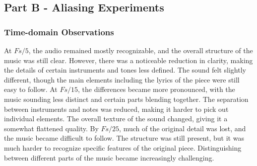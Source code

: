 \documentclass[12pt]{article}
\newcommand{\code}[1]{\colorbox{gray!20}{\texttt{#1}}}
\begin{document}
\subsection{Part B - Aliasing Experiments}
\subsubsection{Time-domain Observations}
At \code{$Fs/5$}, the audio remained mostly recognizable, and the overall structure of the music was still clear. However, there was a noticeable reduction in clarity, making the details of certain instruments and tones less defined. The sound felt slightly different, though the main elements including the lyrics of the piece were still easy to follow. At \code{$Fs/15$}, the differences became more pronounced, with the music sounding less distinct and certain parts blending together. The separation between instruments and notes was reduced, making it harder to pick out individual elements. The overall texture of the sound changed, giving it a somewhat flattened quality. By \code{$Fs/25$}, much of the original detail was lost, and the music became difficult to follow. The structure was still present, but it was much harder to recognize specific features of the original piece. Distinguishing between different parts of the music became increasingly challenging.
\end{document}
